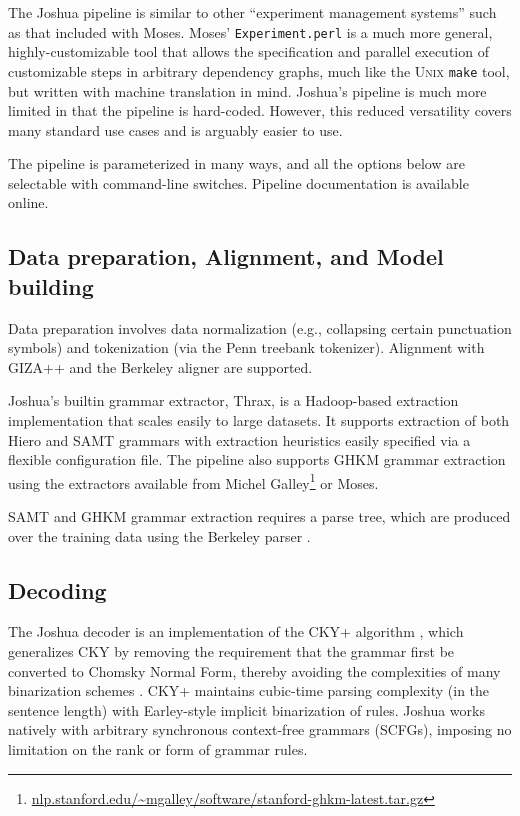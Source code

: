 \documentclass[11pt]{article}
\begin{document}
The Joshua pipeline is similar to other ``experiment
management systems'' such as that included with Moses.  Moses'
\verb|Experiment.perl| is a much more general, highly-customizable
tool that allows the specification and parallel execution of
customizable steps in arbitrary dependency graphs, much like the
\textsc{Unix} \verb|make| tool, but written with machine translation
in mind. Joshua's pipeline is much more limited in that the pipeline
is hard-coded. However, this reduced versatility covers many standard
use cases and is arguably easier to use. 

The pipeline is parameterized in many ways, and all the options below
are selectable with command-line switches. Pipeline documentation is
available online.

\subsection{Data preparation, Alignment, and Model building}

Data preparation involves data normalization (e.g., collapsing certain
punctuation symbols) and tokenization (via the Penn treebank
tokenizer).  Alignment with GIZA++ \cite{giza} and the Berkeley aligner
\cite{berkeley-aligner} are supported.

Joshua's builtin grammar extractor, Thrax, is a Hadoop-based
extraction implementation that scales easily to large datasets. It
supports extraction of both Hiero \cite{Chiang2005} and SAMT grammars
\cite{samt2006} with extraction heuristics easily specified via a
flexible configuration file. The pipeline also supports GHKM grammar
extraction \cite{galley2006scalable} using the extractors available
from Michel
Galley\footnote{\url{nlp.stanford.edu/~mgalley/software/stanford-ghkm-latest.tar.gz}}
or Moses.

SAMT and GHKM grammar extraction requires a parse tree, which are
produced over the training data using the Berkeley parser \cite{petrov2006learning}.

\subsection{Decoding}

The Joshua decoder is an implementation of the CKY+ algorithm
\cite{chappelier1998generalized}, which generalizes CKY by removing
the requirement that the grammar first be converted to Chomsky Normal
Form, thereby avoiding the complexities of many binarization schemes
\cite{zhang2006synchronous,denero2009asynchronous}. CKY+ maintains
cubic-time parsing complexity (in the sentence length) with
Earley-style implicit binarization of rules. Joshua works natively
with arbitrary synchronous context-free grammars (SCFGs), imposing no
limitation on the rank or form of grammar rules. 
\end{document}
